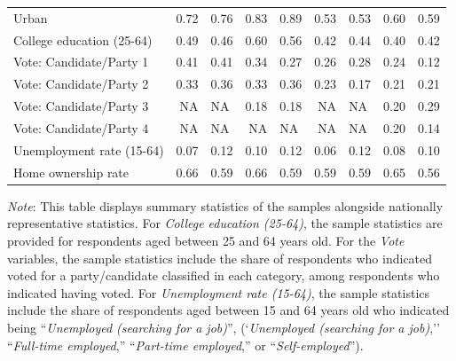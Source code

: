 \begin{table}[h!]
{{\begin{tabular}[t]{lrlrlrlrl}
    Urban & 0.72 & 0.76 & 0.83 & 0.89 & 0.53 & 0.53 & 0.60 & 0.59\\
    \addlinespace
    College education (25-64) & 0.49 & 0.46 & 0.60 & 0.56 & 0.42 & 0.44 & 0.40 & 0.42\\
    \addlinespace
    Vote: Candidate/Party 1 & 0.41 & 0.41 & 0.34 & 0.27 & 0.26 & 0.28 & 0.24 & 0.12\\
    Vote: Candidate/Party 2 & 0.33 & 0.36 & 0.33 & 0.36 & 0.23 & 0.17 & 0.21 & 0.21\\
    Vote: Candidate/Party 3 & NA & NA & 0.18 & 0.18 & NA & NA & 0.20 & 0.29\\
    Vote: Candidate/Party 4 & NA & NA & NA & NA & NA & NA & 0.20 & 0.14\\
    \addlinespace
    Unemployment rate (15-64) & 0.07 & 0.12 & 0.10 & 0.12 & 0.06 & 0.12 & 0.08 & 0.10\\
    \addlinespace
    Home ownership rate & 0.66 & 0.59 & 0.66 & 0.59 & 0.59 & 0.59 & 0.65 & 0.56\\
    \bottomrule
    \end{tabular}
            }
       } \label{tab:sample_composition_1}
        
        {\footnotesize \textit{Note}: This table displays summary statistics of the samples alongside nationally representative statistics. For \textit{College education (25-64)}, the sample statistics are provided for respondents aged between 25 and 64 years old. For the \textit{Vote} variables, the sample statistics include the share of respondents who indicated voted for a party/candidate classified in each category, among respondents who indicated having voted. For \textit{Unemployment rate (15-64)}, the sample statistics include the share of respondents aged between 15 and 64 years old who indicated being ``\textit{Unemployed (searching for a job)}'', (`\textit{Unemployed (searching for a job)},'' ``\textit{Full-time employed},'' ``\textit{Part-time employed},'' or ``\textit{Self-employed}'').}
    \end{table}
    
